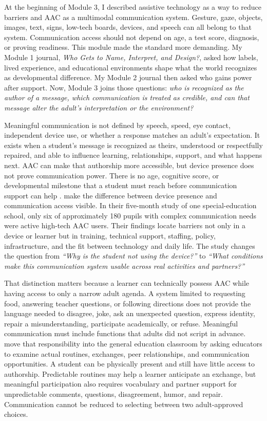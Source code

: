
At the beginning of Module 3, I described assistive technology as a way to reduce barriers and AAC as a multimodal communication system. Gesture, gaze, objects, images, text, signs, low-tech boards, devices, and speech can all belong to that system. Communication access should not depend on age, a test score, diagnosis, or proving readiness. This module made the standard more demanding. My Module 1 journal, \textit{Who Gets to Name, Interpret, and Design?}, asked how labels, lived experience, and educational environments shape what the world recognizes as developmental difference. My Module 2 journal then asked who gains power after support. Now, Module 3 joins those questions:\textit{ who is recognized as the author of a message, which communication is treated as credible, and can that message alter the adult's interpretation or the environment?}

Meaningful communication is not defined by speech, speed, eye contact, independent device use, or whether a response matches an adult's expectation. It exists when a student's message is recognized as theirs, understood or respectfully repaired, and able to influence learning, relationships, support, and what happens next. AAC can make that authorship more accessible, but device presence does not prove communication power. There is no age, cognitive score, or developmental milestone that a student must reach before communication support can help \citep{ashaAAC}. \citet{norrie2021context} make the difference between device presence and communication access visible. In their five-month study of one special-education school, only six of approximately 180 pupils with complex communication needs were active high-tech AAC users. Their findings locate barriers not only in a device or learner but in training, technical support, staffing, policy, infrastructure, and the fit between technology and daily life. The study changes the question from \textit{``Why is the student not using the device?''} to\textit{ ``What conditions make this communication system usable across real activities and partners?''}

That distinction matters because a learner can technically possess AAC while having access to only a narrow adult agenda. A system limited to requesting food, answering teacher questions, or following directions does not provide the language needed to disagree, joke, ask an unexpected question, express identity, repair a misunderstanding, participate academically, or refuse. Meaningful communication must include functions that adults did not script in advance. \citet{downing2015classroom} move that responsibility into the general education classroom by asking educators to examine actual routines, exchanges, peer relationships, and communication opportunities. A student can be physically present and still have little access to authorship. Predictable routines may help a learner anticipate an exchange, but meaningful participation also requires vocabulary and partner support for unpredictable comments, questions, disagreement, humor, and repair. Communication cannot be reduced to selecting between two adult-approved choices.
